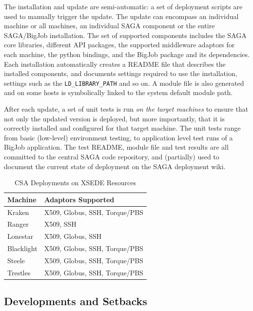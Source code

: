 \documentclass{sig-alternate}
\begin{document}
The installation and update are semi-automatic: a set of deployment
scripts are used to manually trigger the update. The update can encompass an
individual machine or all machines, an individual SAGA component or the entire
SAGA/BigJob installation. The set of supported components includes the SAGA core
libraries, different API packages, the supported
middleware adaptors for each machine, the python bindings, and the
BigJob package and its dependencies. Each installation automatically creates a
README file that describes the installed components, and documents settings
required to use the installation, settings such as the
\texttt{LD\_LIBRARY\_PATH} and so on. A module file is also generated and on
some hosts is symbolically linked to the system default module path. 

After each update, a set of unit tests is run \textit{on the
target machines} to ensure that not only the updated version is deployed, but
more importantly, that it is correctly installed and
configured for that target machine. The unit tests range from basic
(low-level) environment testing, to application level test runs of a
BigJob application. The test README, module file and test results
are all committed to the central SAGA code repository, and
(partially) used to document the current state of deployment on the
SAGA deployment wiki.

\begin{table}
\begin{center}
\begin{tabular}{ll}
\toprule
\textbf{Machine}  & 
\textbf{Adaptors Supported} 
\\ \midrule
Kraken   & 
X509, Globus, SSH, Torque/PBS
\\ \midrule
Ranger   & 
X509, SSH
\\ \midrule
Lonestar & 
X509, Globus, SSH
\\ \midrule
Blacklight & 
X509, Globus, SSH, Torque/PBS
\\ \midrule
Steele & 
X509, Globus, SSH, Torque/PBS
\\ \midrule
Trestles & 
X509, Globus, SSH, Torque/PBS
\\ \bottomrule
\end{tabular}
\caption{CSA Deployments on XSEDE Resources}
\label{table:CSA-Deployments}
\end{center}
\end{table}

\subsection{Developments and Setbacks}
\end{document}
